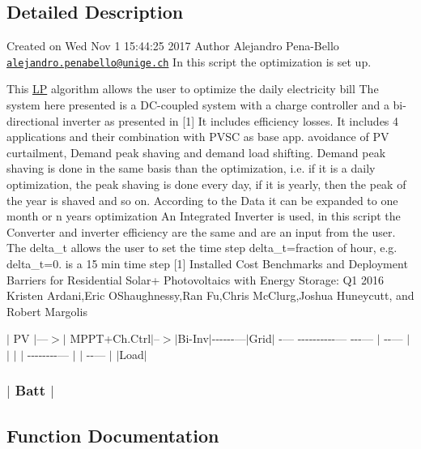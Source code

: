 \subsection{Detailed Description}
Created on Wed Nov 1 15\+:44\+:25 2017 Author Alejandro Pena-\/\+Bello \href{mailto:alejandro.penabello@unige.ch}{\tt alejandro.\+penabello@unige.\+ch} In this script the optimization is set up. 

This \mbox{\hyperlink{namespace_l_p}{LP}} algorithm allows the user to optimize the daily electricity bill The system here presented is a D\+C-\/coupled system with a charge controller and a bi-\/directional inverter as presented in \mbox{[}1\mbox{]} It includes efficiency losses. It includes 4 applications and their combination with P\+V\+SC as base app. avoidance of PV curtailment, Demand peak shaving and demand load shifting. Demand peak shaving is done in the same basis than the optimization, i.\+e. if it is a daily optimization, the peak shaving is done every day, if it is yearly, then the peak of the year is shaved and so on. According to the Data it can be expanded to one month or n years optimization An Integrated Inverter is used, in this script the Converter and inverter efficiency are the same and are an input from the user. The delta\+\_\+t allows the user to set the time step delta\+\_\+t=fraction of hour, e.\+g. delta\+\_\+t=0. is a 15 min time step \mbox{[}1\mbox{]} Installed Cost Benchmarks and Deployment Barriers for Residential Solar+ Photovoltaics with Energy Storage\+: Q1 2016 Kristen Ardani,Eric O\textquotesingle{}Shaughnessy,Ran Fu,Chris Mc\+Clurg,Joshua Huneycutt, and Robert Margolis 

 $\vert$ PV $\vert$---$>$$\vert$ M\+P\+P\+T+\+Ch.Ctrl$\vert$--$>$$\vert$\+Bi-\/\+Inv$\vert$-\/-\/-\/-\/-\/-\/---$\vert$\+Grid$\vert$ -\/--- -\/-\/-\/-\/-\/-\/-\/-\/-\/-\/--- -\/-\/-\/--- $\vert$ -\/-\/--- $\vert$ $\vert$ $\vert$ $\vert$ -\/-\/-\/-\/-\/-\/-\/-\/--- $\vert$ $\vert$ -\/-\/--- $\vert$ $\vert$\+Load$\vert$ 

 \subsubsection*{$\vert$ Batt $\vert$ }

\subsection{Function Documentation}
\mbox{\label{namespace_l_p_a4dc6c0a11259a3e6c48c358aec140385}} 
